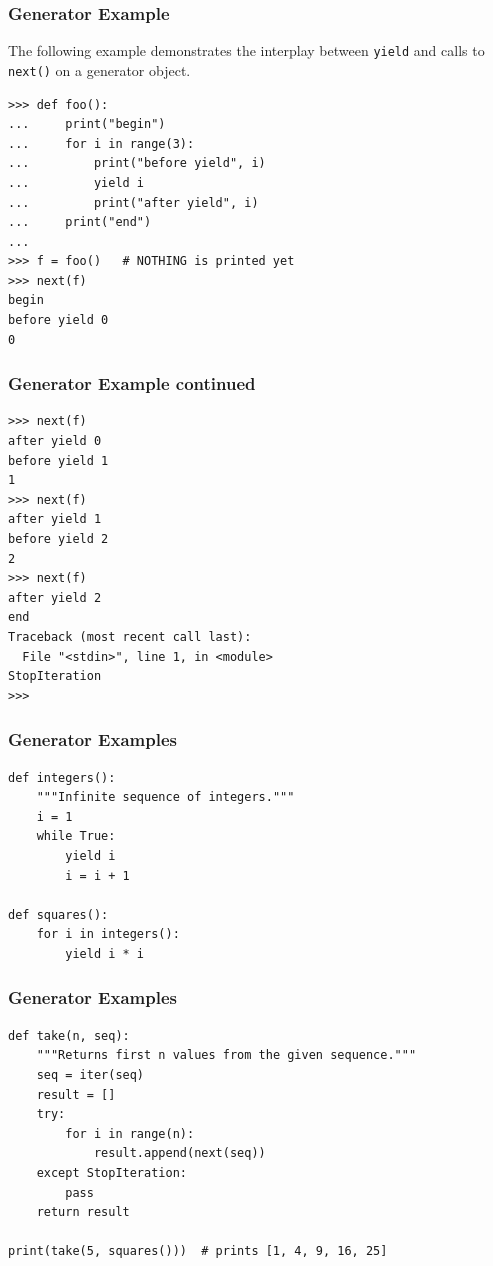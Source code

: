 \begin{frame}[fragile]\frametitle{Generator Example}
The following example demonstrates the interplay between \lstinline|yield| and calls to \lstinline|next()| on a generator object.
\begin{lstlisting}
>>> def foo():
...     print("begin")
...     for i in range(3):
...         print("before yield", i)
...         yield i
...         print("after yield", i)
...     print("end")
...
>>> f = foo()   # NOTHING is printed yet
>>> next(f)
begin
before yield 0
0
\end{lstlisting}
\end{frame}

\begin{frame}[fragile]\frametitle{Generator Example continued}
\begin{lstlisting}
>>> next(f)
after yield 0
before yield 1
1
>>> next(f)
after yield 1
before yield 2
2
>>> next(f)
after yield 2
end
Traceback (most recent call last):
  File "<stdin>", line 1, in <module>
StopIteration
>>>
\end{lstlisting}
\end{frame}

\begin{frame}[fragile]\frametitle{Generator Examples}
\begin{lstlisting}
def integers():
    """Infinite sequence of integers."""
    i = 1
    while True:
        yield i
        i = i + 1
        
def squares():
    for i in integers():
        yield i * i
\end{lstlisting}
\end{frame}

\begin{frame}[fragile]\frametitle{Generator Examples}
\begin{lstlisting}
def take(n, seq):
    """Returns first n values from the given sequence."""
    seq = iter(seq)
    result = []
    try:
        for i in range(n):
            result.append(next(seq))
    except StopIteration:
        pass
    return result

print(take(5, squares()))  # prints [1, 4, 9, 16, 25]
\end{lstlisting}
\end{frame}




